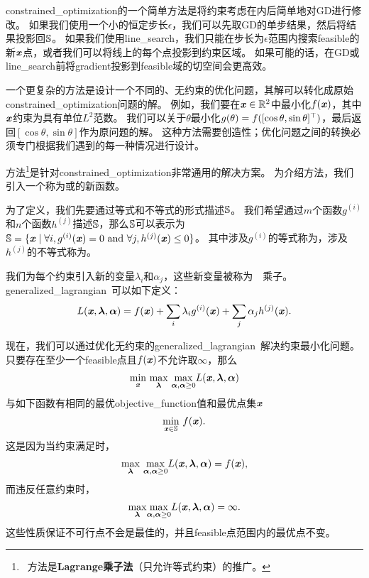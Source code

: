 \gls{constrained_optimization}的一个简单方法是将约束考虑在内后简单地对\gls{GD}进行修改。
如果我们使用一个小的恒定步长$\epsilon$，我们可以先取\gls{GD}的单步结果，然后将结果投影回$\mathbb{S}$。
如果我们使用\gls{line_search}，我们只能在步长为$\epsilon$范围内搜索\gls{feasible}的新$\boldsymbol{\mathit{x}}$点，或者我们可以将线上的每个点投影到约束区域。
如果可能的话，在\gls{GD}或\gls{line_search}前将\gls{gradient}投影到\gls{feasible}域的切空间会更高效\citep{rosen1960}。

一个更复杂的方法是设计一个不同的、无约束的优化问题，其解可以转化成原始\gls{constrained_optimization}问题的解。
例如，我们要在$\boldsymbol{\mathit{x}} \in \mathbb{R}^2$中最小化$f(\boldsymbol{\mathit{x}})$，其中$\boldsymbol{\mathit{x}}$约束为具有单位$L^2$范数。
我们可以关于$\theta$最小化$g(\theta) = f([\cos \theta, \sin \theta]^\top)$，最后返回$[\cos \theta, \sin \theta]$作为原问题的解。
这种方法需要创造性；优化问题之间的转换必须专门根据我们遇到的每一种情况进行设计。


方法\footnote{~方法是\textbf{Lagrange乘子法}（只允许等式约束）的推广。}是针对\gls{constrained_optimization}非常通用的解决方案。
为介绍方法，我们引入一个称为或的新函数。

为了定义，我们先要通过等式和不等式的形式描述$\mathbb{S}$。 
我们希望通过$m$个函数$g^{(i)}$和$n$个函数$h^{(j)}$描述$\mathbb{S}$，那么$\mathbb{S}$可以表示为$\mathbb{S} = \{ \boldsymbol{\mathit{x}} \mid \forall i, g^{(i)}(\boldsymbol{\mathit{x}}) = 0 ~\text{and}~ \forall j, h^{(j)}(\boldsymbol{\mathit{x}}) \leq 0  \}$。
其中涉及$g^{(i)}$的等式称为，涉及$h^{(j)}$的不等式称为。

我们为每个约束引入新的变量$\lambda_i$和$\alpha_j$，这些新变量被称为~~乘子。\gls{generalized_lagrangian}~可以如下定义：
\begin{align}
 L(\boldsymbol{\mathit{x}}, \boldsymbol{\lambda}, \boldsymbol{\alpha}) = f(\boldsymbol{\mathit{x}}) + \sum_i \lambda_i g^{(i)}(\boldsymbol{\mathit{x}})  + \sum_j \alpha_j h^{(j)}(\boldsymbol{\mathit{x}}).
\end{align}

现在，我们可以通过优化无约束的\gls{generalized_lagrangian}~解决约束最小化问题。
只要存在至少一个\gls{feasible}点且$f(\boldsymbol{\mathit{x}})$不允许取$\infty$，那么
\begin{align}
 \underset{\boldsymbol{\mathit{x}}}{\min}~  \underset{\boldsymbol{\lambda}}{\max}~
 \underset{\boldsymbol{\alpha}, \boldsymbol{\alpha} \geq 0}{\max}   L(\boldsymbol{\mathit{x}}, \boldsymbol{\lambda}, \boldsymbol{\alpha}) 
\end{align}
与如下函数有相同的最优\gls{objective_function}值和最优点集$\boldsymbol{\mathit{x}}$
\begin{align}
 \underset{\boldsymbol{\mathit{x}} \in \mathbb{S}}{\min}~ f(\boldsymbol{\mathit{x}}).
\end{align}
这是因为当约束满足时，
\begin{align}
  \underset{\boldsymbol{\lambda}}{\max}~
 \underset{\boldsymbol{\alpha}, \boldsymbol{\alpha} \geq 0}{\max}   L(\boldsymbol{\mathit{x}}, \boldsymbol{\lambda}, \boldsymbol{\alpha})  = f(\boldsymbol{\mathit{x}}) ,
\end{align}
而违反任意约束时，
\begin{align}
  \underset{\boldsymbol{\lambda}}{\max}  
 \underset{\boldsymbol{\alpha}, \boldsymbol{\alpha} \geq 0}{\max}   L(\boldsymbol{\mathit{x}}, \boldsymbol{\lambda}, \boldsymbol{\alpha})  = \infty .
\end{align}
这些性质保证不可行点不会是最佳的，并且\gls{feasible}点范围内的最优点不变。

